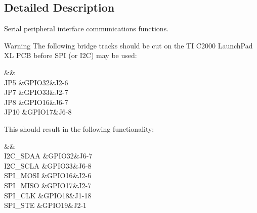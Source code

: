 \subsection{Detailed Description}
Serial peripheral interface communications functions. \begin{DoxyWarning}{Warning}
The following bridge tracks should be cut on the T\-I C2000 Launch\-Pad X\-L P\-C\-B before S\-P\-I (or I2\-C) may be used\-: \begin{TabularC}{3}
\hline
{}\PBS{}&\PBS{}&\PBS{}\\
\PBS\centering J\-P5 &\PBS\centering G\-P\-I\-O32&\PBS\centering J2-\/6 \\
\PBS\centering J\-P7 &\PBS\centering G\-P\-I\-O33&\PBS\centering J2-\/7 \\
\PBS\centering J\-P8 &\PBS\centering G\-P\-I\-O16&\PBS\centering J6-\/7 \\
\PBS\centering J\-P10 &\PBS\centering G\-P\-I\-O17&\PBS\centering J6-\/8 \\
\end{TabularC}
This should result in the following functionality\-: \begin{TabularC}{3}
\hline
{}\PBS{}&\PBS{}&\PBS{}\\
\PBS\centering I2\-C\-\_\-\-S\-D\-A\-A &\PBS\centering G\-P\-I\-O32&\PBS\centering J6-\/7 \\
\PBS\centering I2\-C\-\_\-\-S\-C\-L\-A &\PBS\centering G\-P\-I\-O33&\PBS\centering J6-\/8 \\
\PBS\centering S\-P\-I\-\_\-\-M\-O\-S\-I &\PBS\centering G\-P\-I\-O16&\PBS\centering J2-\/6 \\
\PBS\centering S\-P\-I\-\_\-\-M\-I\-S\-O &\PBS\centering G\-P\-I\-O17&\PBS\centering J2-\/7 \\
\PBS\centering S\-P\-I\-\_\-\-C\-L\-K &\PBS\centering G\-P\-I\-O18&\PBS\centering J1-\/18 \\
\PBS\centering S\-P\-I\-\_\-\-S\-T\-E &\PBS\centering G\-P\-I\-O19&\PBS\centering J2-\/1 \\
\end{TabularC}

\end{DoxyWarning}


